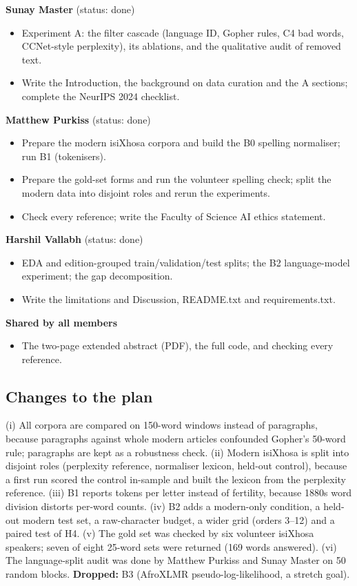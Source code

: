 \documentclass[10pt,letterpaper]{article}
\begin{document}
\textbf{Sunay Master} (status: done)
\begin{itemize}
    \item Experiment A: the filter cascade (language ID, Gopher rules, C4 bad words, CCNet-style perplexity), its ablations, and the qualitative audit of removed text.
    \item Write the Introduction, the background on data curation and the A sections; complete the NeurIPS 2024 checklist.
\end{itemize}

\textbf{Matthew Purkiss} (status: done)
\begin{itemize}
    \item Prepare the modern isiXhosa corpora and build the B0 spelling normaliser; run B1 (tokenisers).
    \item Prepare the gold-set forms and run the volunteer spelling check; split the modern data into disjoint roles and rerun the experiments.
    \item Check every reference; write the Faculty of Science AI ethics statement.
\end{itemize}

\textbf{Harshil Vallabh} (status: done)
\begin{itemize}
    \item EDA and edition-grouped train/validation/test splits; the B2 language-model experiment; the gap decomposition.
    \item Write the limitations and Discussion, README.txt and requirements.txt.
\end{itemize}

\textbf{Shared by all members}
\begin{itemize}
    \item The two-page extended abstract (PDF), the full code, and checking every reference.
\end{itemize}

\subsection{Changes to the plan}
(i) All corpora are compared on 150-word windows instead of paragraphs, because paragraphs against whole modern articles confounded Gopher's 50-word rule; paragraphs are kept as a robustness check. (ii) Modern isiXhosa is split into disjoint roles (perplexity reference, normaliser lexicon, held-out control), because a first run scored the control in-sample and built the lexicon from the perplexity reference. (iii) B1 reports tokens per letter instead of fertility, because 1880s word division distorts per-word counts. (iv) B2 adds a modern-only condition, a held-out modern test set, a raw-character budget, a wider grid (orders 3--12) and a paired test of H4. (v) The gold set was checked by six volunteer isiXhosa speakers; seven of eight 25-word sets were returned (169 words answered). (vi) The language-split audit was done by Matthew Purkiss and Sunay Master on 50 random blocks. \textbf{Dropped:} B3 (AfroXLMR pseudo-log-likelihood, a stretch goal).
\end{document}
